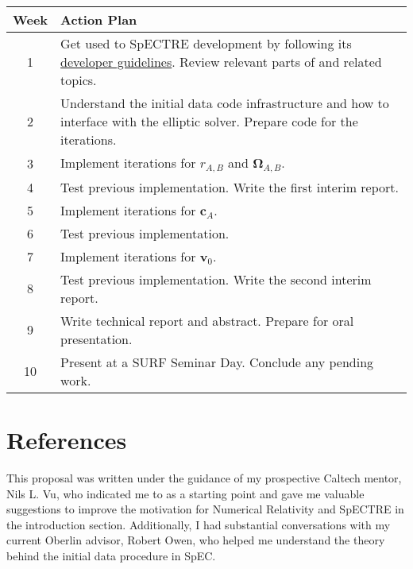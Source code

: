 \documentclass{../letter}
\renewcommand{\v}[1]{\boldsymbol{#1}}
\begin{document}
	\begin{center}
		\setlength{\tabcolsep}{0.5cm}
		\def\arraystretch{1.5}
		\begin{tabular}{cp{}}
			\hline
			\textbf{Week} & \textbf{Action Plan} \\ \hline
			1 & Get used to SpECTRE development by following its \href{https://spectre-code.org/dev_guide.html}{developer guidelines}. Review relevant parts of \cite{Serguei} and related topics. \\
			2 & Understand the initial data code infrastructure and how to interface with the elliptic solver. Prepare code for the iterations. \\
			3 & Implement iterations for $r_{A,B}$ and $\v \Omega_{A,B}$. \\
			4 & Test previous implementation. Write the first interim report. \\
			5 & Implement iterations for $\v c_A$. \\
			6 & Test previous implementation. \\
			7 & Implement iterations for $\v v_0$. \\
			8 & Test previous implementation. Write the second interim report. \\
			9 & Write technical report and abstract. Prepare for oral presentation. \\
			10 & Present at a SURF Seminar Day. Conclude any pending work. \\ \hline
		\end{tabular}
	\end{center}

	\newpage

	\section{References}

	This proposal was written under the guidance of my prospective Caltech mentor, Nils L. Vu, who indicated me to \cite{Serguei} as a starting point and gave me valuable suggestions to improve the motivation for Numerical Relativity and SpECTRE in the introduction section. Additionally, I had substantial conversations with my current Oberlin advisor, Robert Owen, who helped me understand the theory behind the initial data procedure in SpEC.

	\printbibliography[heading=none]
\end{document}
